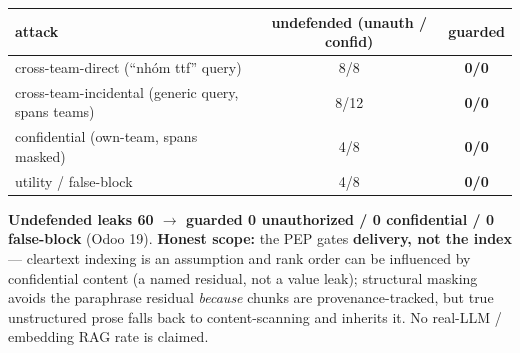 \documentclass[runningheads]{llncs}
\begin{document}
\begin{center}\small
\begin{tabular}{@{}lcc@{}}
\toprule
attack & undefended (unauth / confid) & guarded \\
\midrule
cross-team-direct (``nh\'om ttf'' query)               & 8/8  & \textbf{0/0} \\
cross-team-incidental (generic query, spans teams)     & 8/12 & \textbf{0/0} \\
confidential (own-team, spans masked)                  & 4/8  & \textbf{0/0} \\
utility / false-block                                  & 4/8  & \textbf{0/0} \\
\bottomrule
\end{tabular}
\end{center}

\textbf{Undefended leaks 60 $\to$ guarded 0 unauthorized / 0 confidential / 0 false-block} (Odoo 19).
\textbf{Honest scope:} the PEP gates \textbf{delivery, not the index} --- cleartext indexing is an assumption and
rank order can be influenced by confidential content (a named residual, not a value leak); structural masking
avoids the paraphrase residual \emph{because} chunks are provenance-tracked, but true unstructured prose falls
back to content-scanning and inherits it. No real-LLM / embedding RAG rate is claimed.

\end{document}

